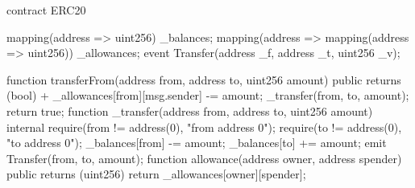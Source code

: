  contract ERC20 {
   mapping(address => uint256) _balances;
   mapping(address => mapping(address => uint256)) _allowances;
   event Transfer(address _f, address _t, uint256 _v);
   
   function transferFrom(address from, address to, uint256 amount) public returns (bool) {
+    _allowances[from][msg.sender] -= amount;
     _transfer(from, to, amount);
     return true;
   }
   function _transfer(address from, address to, uint256 amount) internal {
     require(from != address(0), "from address 0");
     require(to != address(0), "to address 0");
     _balances[from] -= amount;
     _balances[to] += amount;
     emit Transfer(from, to, amount);
   }
   function allowance(address owner, address spender) public returns (uint256) {
     return _allowances[owner][spender];
   }
 }